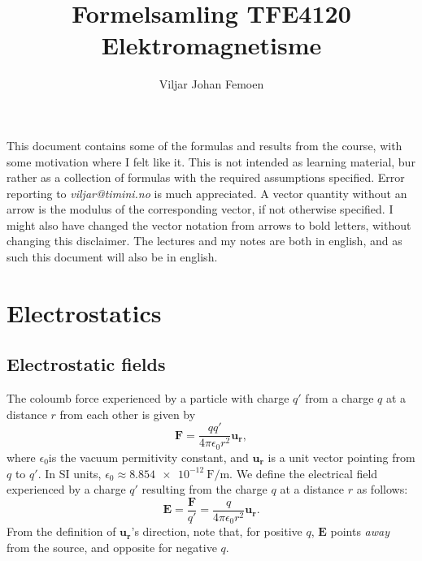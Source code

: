 \documentclass[a4paper, 12pt]{article}
\title{Formelsamling TFE4120 Elektromagnetisme}
\renewcommand{\vec}[1]{\mathbf{#1}}
\newcommand{\E}{\ensuremath{\vec{E}}}
\newcommand{\e}{\ensuremath{\epsilon_0}}
\begin{document}
\author{Viljar Johan Femoen} %

\flushbottom
\maketitle
\thispagestyle{empty}
\vskip 20pt
\vskip 2pt
\noindent This document contains some of the formulas and results from the course, with some motivation where I felt like it. 
This is not intended as learning material, bur rather as a collection of formulas with the required assumptions specified. 
Error reporting to \textit{viljar@timini.no} is much appreciated. 
A vector quantity without an arrow is the modulus of the corresponding vector, if not otherwise specified. 
I might also have changed the vector notation from arrows to bold letters, without changing this disclaimer. 
The lectures and my notes are both in english, and as such this document will also be in english.

\tableofcontents

\section{Electrostatics}
\subsection{Electrostatic fields}
    The coloumb force experienced by a particle with charge $q'$ from a charge $q$ at a distance $r$ from each other is given by 
    \begin{equation}
        \vec{F} = \frac{qq'}{4\pi\e r^2}\vec{u_r},
    \end{equation}
    where \e is the vacuum permitivity constant, and $\vec{u_r}$ is a unit vector pointing from $q$ to $q'$. 
    In SI units, $\e \approx \SI{8.854e-12}{\farad \per \metre}$.
    We define the electrical field experienced by a charge $q'$ resulting from the charge $q$ at a distance $r$ as follows:
    \begin{equation}
        \E = \frac{\vec{F}}{q'} = \frac{q}{4\pi\e r^2}\vec{u_r}.
    \end{equation}
    From the definition of $\vec{u_r}$'s direction, note that, for positive $q$, 
    \E{} points \textit{away} from the source, and opposite for negative $q$.
    
\end{document}

